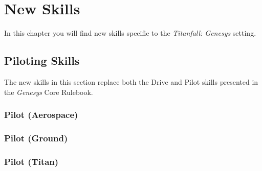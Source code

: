 \chapter{New Skills}
In this chapter you will find new skills specific to the \emph{Titanfall: Genesys} setting.

\section{Piloting Skills}
The new skills in this section replace both the Drive and Pilot skills presented in the \emph{Genesys} Core Rulebook.

\subsection{Pilot (Aerospace)}



\subsection{Pilot (Ground)}



\subsection{Pilot (Titan)}